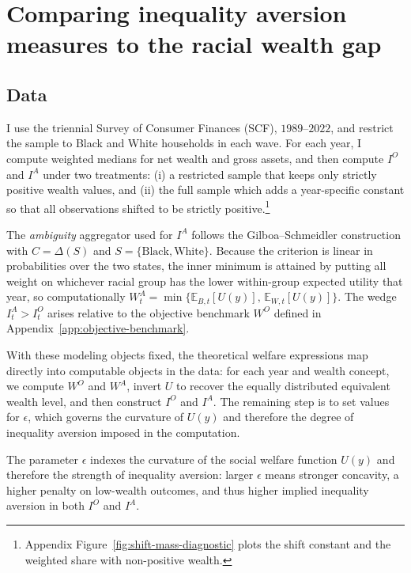 \documentclass[../../../00-main.tex]{subfiles}
\begin{document}
\section{Comparing inequality aversion measures to the racial wealth gap}
\label{subsec:compute-measures}

\subsection{Data}

\par I use the triennial Survey of Consumer Finances (SCF), $1989$--$2022$, and restrict the sample to Black and White households in each wave. For each year, I compute weighted medians for net wealth and gross assets, and then compute $I^{O}$ and $I^{A}$ under two treatments: (i) a restricted sample that keeps only strictly positive wealth values, and (ii) the full sample which adds a year-specific constant so that all observations shifted to be strictly positive.\footnote{Appendix Figure~\ref{fig:shift-mass-diagnostic} plots the shift constant and the weighted share with non-positive wealth.}

\par The \textit{ambiguity} aggregator used for $I^{A}$ follows the Gilboa--Schmeidler construction with $C=\Delta(S)$ and $S=\{\text{Black},\text{White}\}$. Because the criterion is linear in probabilities over the two states, the inner minimum is attained by putting all weight on whichever racial group has the lower within-group expected utility that year, so computationally $W^{A}_{t}=\min\{\mathbb{E}_{B,t}[U(y)],\,\mathbb{E}_{W,t}[U(y)]\}$. The wedge $I^{A}_{t}>I^{O}_{t}$ arises relative to the objective benchmark $W^{O}$ defined in Appendix~\ref{app:objective-benchmark}.

\par With these modeling objects fixed, the theoretical welfare expressions map directly into computable objects in the data: for each year and wealth concept, we compute $W^{O}$ and $W^{A}$, invert $U$ to recover the equally distributed equivalent wealth level, and then construct $I^{O}$ and $I^{A}$. The remaining step is to set values for $\epsilon$, which governs the curvature of $U(y)$ and therefore the degree of inequality aversion imposed in the computation.

\par The parameter $\epsilon$ indexes the curvature of the social welfare function $U(y)$ and therefore the strength of inequality aversion: larger $\epsilon$ means stronger concavity, a higher penalty on low-wealth outcomes, and thus higher implied inequality aversion in both $I^{O}$ and $I^{A}$.
\end{document}
